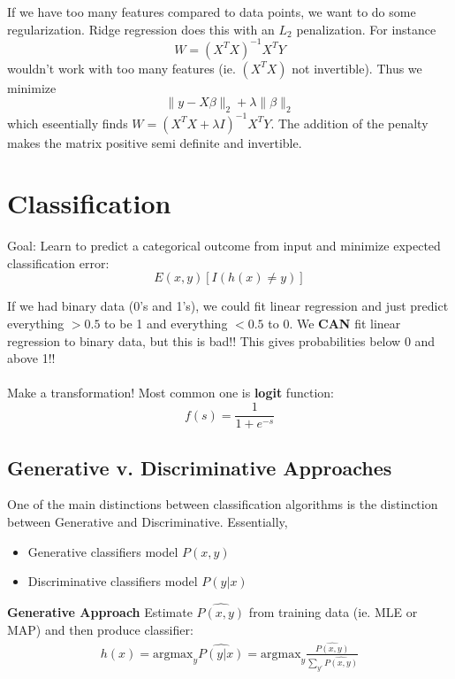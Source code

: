 \documentclass[a4paper]{article}\usepackage[]{graphicx}\usepackage[]{color}
\begin{document}
If we have too many features compared to data points, we want to do some regularization. Ridge regression does this with an $L_2$ penalization. For instance
\begin{equation*} W = (X^T X)^{-1} X^T Y \end{equation*}
wouldn't work with too many features (ie. $(X^T X)$ not invertible). Thus we minimize
\begin{equation*} \lVert y-X\beta \rVert_2 + \lambda \lVert \beta \rVert_2 \end{equation*}
which eseentially finds $W=(X^T X + \lambda I)^{-1} X^T Y$. The addition of the penalty makes the matrix positive semi definite and invertible. 

\section{Classification}

Goal: Learn to predict a categorical outcome from input and minimize expected classification error:
\begin{equation*}
E{(x,y)}[I(h(x)\neq y)]
\end{equation*}

If we had binary data (0's and 1's), we could fit linear regression and just predict everything $>0.5$ to be 1 and everything $<0.5$ to 0. We \textbf{CAN} fit linear regression to binary data, but this is bad!! This gives probabilities below 0 and above 1!! \\
\\
Make a transformation! Most common one is \textbf{logit} function:
\begin{equation*}
f(s) = \frac{1}{1+e^{-s}}
\end{equation*}

\subsection{Generative v. Discriminative Approaches}
One of the main distinctions between classification algorithms is the distinction between Generative and Discriminative. Essentially, 
\begin{itemize}
\item Generative classifiers model $P(x,y)$
\item Discriminative classifiers model $P(y|x)$
\end{itemize}

\textbf{Generative Approach}
Estimate $\hat{P(x,y)}$ from training data (ie. MLE or MAP) and then produce classifier:
\begin{align*}
h(x) = \text{argmax}_y \hat{P(y|x)} = \text{argmax}_y \frac{\hat{P(x,y)}}{\sum_{y'}\hat{P(x,y)}}
\end{align*}
\end{document}
